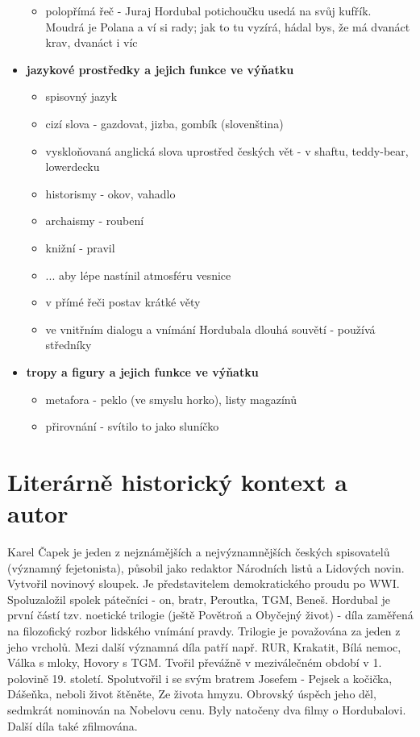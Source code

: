 \documentclass[11pt]{article}
\begin{document}
\begin{itemize}
\begin{itemize}
            \item polopřímá řeč -  Juraj Hordubal potichoučku usedá na svůj kufřík. Moudrá je Polana a ví si rady; jak to tu vyzírá, hádal bys, že má dvanáct krav, dvanáct i víc
        \end{itemize}
        \item\textbf{jazykové prostředky a jejich funkce ve výňatku}
        \begin{itemize}
            \item spisovný jazyk
            \item cizí slova - gazdovat, jizba, gombík (slovenština)
            \item vyskloňovaná anglická slova uprostřed českých vět - v shaftu, teddy-bear, lowerdecku
            \item historismy - okov, vahadlo
            \item archaismy - roubení
            \item knižní - pravil
            \item ... aby lépe nastínil atmosféru vesnice
            \item v přímé řeči postav krátké věty
            \item ve vnitřním dialogu a vnímání Hordubala dlouhá souvětí - používá středníky
        \end{itemize}
        \item\textbf{tropy a figury a jejich funkce ve výňatku}
        \begin{itemize}
            \item metafora - peklo (ve smyslu horko), listy magazínů
            \item přirovnání - svítilo to jako sluníčko
        \end{itemize}
    \end{itemize}
    \section*{Literárně historický kontext a autor}
    Karel Čapek je jeden z nejznámějších a nejvýznamnějších českých spisovatelů (významný fejetonista), působil jako redaktor Národních listů a Lidových novin.
    Vytvořil novinový sloupek. Je představitelem demokratického proudu po WWI.
    Spoluzaložil spolek pátečníci - on, bratr, Peroutka, TGM, Beneš.
    Hordubal je první částí tzv. noetické trilogie (ještě Povětroň a Obyčejný život) - díla zaměřená na filozofický rozbor lidského vnímání pravdy. Trilogie je považována za jeden z jeho vrcholů.
    Mezi další významná díla patří např. RUR, Krakatit, Bílá nemoc, Válka s mloky, Hovory s TGM.
    Tvořil převážně v meziválečném období v 1. polovině 19. století.
    Spolutvořil i se svým bratrem Josefem - Pejsek a kočička, Dášeňka, neboli život štěněte, Ze života hmyzu.
    Obrovský úspěch jeho děl, sedmkrát nominován na Nobelovu cenu.
    Byly natočeny dva filmy o Hordubalovi. Další díla také zfilmována.
\end{document}
